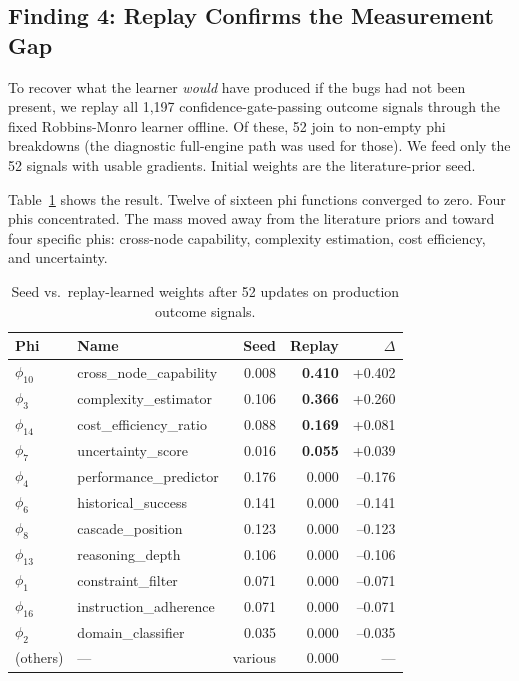 \subsection{Finding 4: Replay Confirms the Measurement Gap}

To recover what the learner \emph{would} have produced if the bugs had not been present, we replay all 1{,}197 confidence-gate-passing outcome signals through the fixed Robbins-Monro learner offline. Of these, 52 join to non-empty phi breakdowns (the diagnostic full-engine path was used for those). We feed only the 52 signals with usable gradients. Initial weights are the literature-prior seed.

Table~\ref{tab:replay_weights} shows the result. Twelve of sixteen phi functions converged to zero. Four phis concentrated. The mass moved away from the literature priors and toward four specific phis: cross-node capability, complexity estimation, cost efficiency, and uncertainty.

\begin{table}[h]
\centering
\caption{Seed vs.\ replay-learned weights after 52 updates on production outcome signals.}
\label{tab:replay_weights}
\small
\begin{tabular}{llrrr}
\toprule
\textbf{Phi} & \textbf{Name} & \textbf{Seed} & \textbf{Replay} & \textbf{$\Delta$} \\
\midrule
$\phi_{10}$ & cross\_node\_capability & 0.008 & \textbf{0.410} & +0.402 \\
$\phi_3$ & complexity\_estimator & 0.106 & \textbf{0.366} & +0.260 \\
$\phi_{14}$ & cost\_efficiency\_ratio & 0.088 & \textbf{0.169} & +0.081 \\
$\phi_7$ & uncertainty\_score & 0.016 & \textbf{0.055} & +0.039 \\
\midrule
$\phi_4$ & performance\_predictor & 0.176 & 0.000 & --0.176 \\
$\phi_6$ & historical\_success & 0.141 & 0.000 & --0.141 \\
$\phi_8$ & cascade\_position & 0.123 & 0.000 & --0.123 \\
$\phi_{13}$ & reasoning\_depth & 0.106 & 0.000 & --0.106 \\
$\phi_1$ & constraint\_filter & 0.071 & 0.000 & --0.071 \\
$\phi_{16}$ & instruction\_adherence & 0.071 & 0.000 & --0.071 \\
$\phi_2$ & domain\_classifier & 0.035 & 0.000 & --0.035 \\
(others) & --- & various & 0.000 & --- \\
\bottomrule
\end{tabular}
\end{table}


